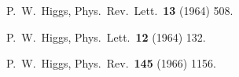 \documentclass[a4paper,12pt]{article}
\begin{document}
\begin{thebibliography}{99} %

  P.~W.~Higgs,
  Phys.\ Rev.\ Lett.\  {\bf 13} (1964) 508.

  P.~W.~Higgs,
  Phys.\ Lett.\  {\bf 12} (1964) 132.

  P.~W.~Higgs,
  Phys.\ Rev.\  {\bf 145} (1966) 1156.
\end{thebibliography}
\end{document}
